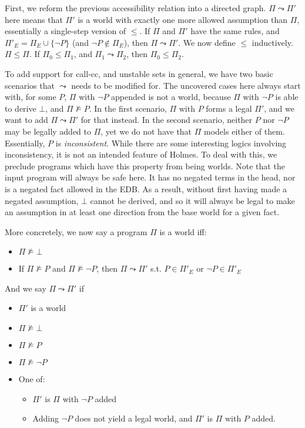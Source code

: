 First, we reform the previous accessibility relation into a directed graph.
$\Pi \leadsto \Pi'$ here means that $\Pi'$ is a world with exactly one more allowed assumption than $\Pi$, essentially a single-step version of $\leq$.
If $\Pi$ and $\Pi'$ have the same rules, and $\Pi'_E = \Pi_E \cup \{\neg P\}$ (and $\neg P \not \in \Pi_E$), then $\Pi \leadsto \Pi'$.
We now define $\leq$ inductively.
$\Pi \leq \Pi$.
If $\Pi_0 \leq \Pi_1$, and $\Pi_1 \leadsto \Pi_2$, then $\Pi_0 \leq \Pi_2$.

To add support for call-cc, and unstable sets in general, we have two basic scenarios that $\leadsto$ needs to be modified for.
The uncovered cases here always start with, for some $P$, $\Pi$ with $\neg P$ appended is not a world, because $\Pi$ with $\neg P$ is able to derive $\bot$, and $\Pi \not \models P$.
In the first scenario, $\Pi$ with $P$ forms a legal $\Pi'$, and we want to add $\Pi \leadsto \Pi'$ for that instead.
In the second scenario, neither $P$ nor $\neg P$ may be legally added to $\Pi$, yet we do not have that $\Pi$ models either of them.
Essentially, $P$ is \emph{inconsistent}.
While there are some interesting logics involving inconsistency, it is not an intended feature of Holmes.
To deal with this, we preclude programs which have this property from being worlds.
Note that the input program will always be safe here.
It has no negated terms in the head, nor is a negated fact allowed in the EDB.
As a result, without first having made a negated assumption, $\bot$ cannot be derived, and so it will always be legal to make an assumption in at least one direction from the base world for a given fact.

More concretely, we now say a program $\Pi$ is a world iff:
\begin{itemize}
	\item $\Pi \not \models \bot$
	\item If $\Pi \not \models P$ and $\Pi \not \models \neg P$, then $\Pi \leadsto \Pi'$ s.t. $P \in \Pi'_E$ or $\neg P \in \Pi'_E$
\end{itemize}

And we say $\Pi \leadsto \Pi'$ if
\begin{itemize}
	\item $\Pi'$ is a world
	\item $\Pi \not \models \bot$
	\item $\Pi \not \models P$
	\item $\Pi \not \models \neg P$
	\item One of:
	\begin{itemize}
		\item $\Pi'$ is $\Pi$ with $\neg P$ added
		\item Adding $\neg P$ does not yield a legal world, and $\Pi'$ is $\Pi$ with $P$ added.
	\end{itemize}
\end{itemize}

